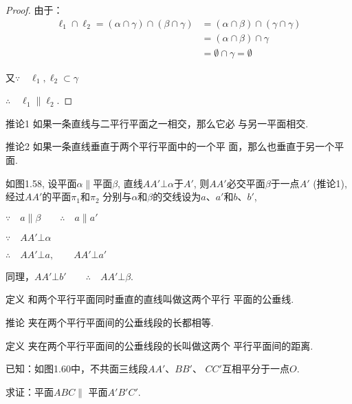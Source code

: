 \begin{proof}
由于：
\[\begin{split}
  \ell_1\cap \ell_2=(\alpha\cap \gamma)\cap (\beta\cap \gamma)&=(\alpha\cap \beta)\cap (\gamma\cap \gamma)\\
  &=(\alpha\cap \beta)\cap \gamma\\
  &=\emptyset\cap\gamma=\emptyset
\end{split}\]

又$\because\quad \ell_1,\ell_2\subset\gamma$

$\therefore\quad\ell_1\parallel \ell_2$.
\end{proof}

\begin{blk}
  {推论1} 如果一条直线与二平行平面之一相交，那么它必
与另一平面相交. 
\end{blk}


\begin{blk}
  {推论2} 如果一条直线垂直于两个平行平面中的一个平
面，那么也垂直于另一个平面. 
\end{blk}

如图1.58, 设平面$\alpha\parallel$平面$\beta$, 直线$AA'\bot\alpha$于$A'$, 则$AA'$必交平面$\beta$于一点$A'$ (推论1), 经过$AA'$的平面$\pi_1$和$\pi_2$
分别与$\alpha$和$\beta$的交线设为$a$、$a'$和$b$、$b'$,

$\because\quad a\parallel \beta \qquad \therefore\quad a\parallel a'$

$\because\quad AA'\bot \alpha$

$\therefore\quad AA'\bot a,\quad \quad AA'\bot a'$

同理，$AA'\bot b'\qquad \therefore\quad AA'\bot\beta$.



\begin{blk}
  {定义} 和两个平行平面同时垂直的直线叫做这两个平行
平面的公垂线. 
\end{blk}


\begin{blk}
  {推论} 夹在两个平行平面间的公垂线段的长都相等. 
\end{blk}


\begin{blk}
{定义} 夹在两个平行平面间的公垂线段的长叫做这两个
平行平面间的距离. 
  \end{blk}

\begin{example}
  已知：如图1.60中，不共面三线段$AA'$、$BB'$、
  $CC'$互相平分于一点$O$.

  求证：平面$ABC\parallel$ 平面$A'B'C'$.
\end{example}

